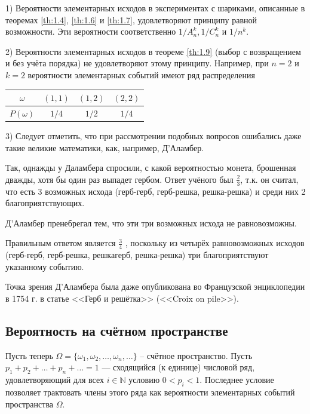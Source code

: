 \begin{zam}

1) Вероятности элементарных исходов в экспериментах с шариками, описанные в теоремах \ref{th:1.4}, \ref{th:1.6} и \ref{th:1.7}, удовлетворяют принципу равной возможности. Эти вероятности соответственно $1/A_n^k , 1/C_n^k$ и $1/n^k$.

2) Вероятности элементарных исходов в теореме \ref{th:1.9} (выбор с возвращением и без учёта порядка) не удовлетворяют этому принципу. Например, при $n = 2$
и $k = 2$ вероятности элементарных событий имеют ряд распределения

\begin{center}
	\begin{tabular}{|c|c|c|c|}
		\hline
		$\omega$ & $(1,1)$ & $(1,2)$ & $(2,2)$ \\ \hline
		$P(\omega)$  & $1/4$ & $1/2$  & $1/4$ \\ \hline
	\end{tabular}
\end{center}

3) Следует отметить, что при рассмотрении подобных вопросов ошибались даже такие великие математики, как, например, Д'Аламбер. 

Так, однажды у Даламбера спросили, с какой вероятностью монета, брошенная дважды, хотя бы один раз выпадет гербом. Ответ учёного был $\frac{2}{3}$, т.к. он считал, что есть 3 возможных исхода (герб-герб, герб-решка, решка-решка) и среди них 2 благоприятствующих. 

Д'Аламбер пренебрегал тем, что эти три возможных исхода не равновозможны. 

Правильным ответом является $\frac{3}{4}$ , поскольку из четырёх равновозможных исходов (герб-герб, герб-решка, решкагерб, решка-решка) три благоприятствуют указанному событию. 

Точка зрения Д'Аламбера была даже опубликована во Французской энциклопедии в 1754 г. в статье <<Герб и решётка>> (<<Croix on pile>>).
\end{zam}
 

\subsection{Вероятность на счётном пространстве}
Пусть теперь $\Omega = \{\omega_1 , \omega_2 , \ldots , \omega_n , \ldots \}$ – счётное пространство. Пусть $p_1 + p_2 + \ldots + p_n + \ldots = 1$ — сходящийся (к единице) числовой ряд, удовлетворяющий
для всех $i \in \mathbb{N}$ условию $0 < p_i < 1$. Последнее условие позволяет трактовать члены этого ряда как вероятности элементарных событий пространства $\Omega$.

